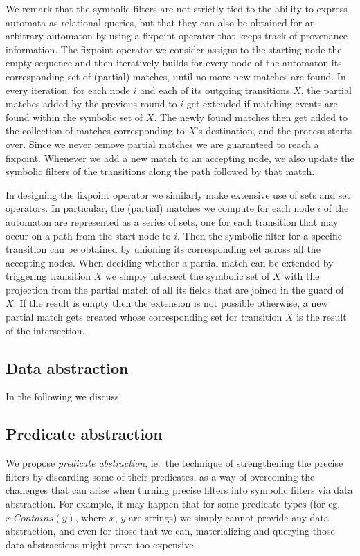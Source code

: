 We remark that the symbolic filters are not strictly tied to the ability to 
express automata as relational queries, but that they can also be obtained for 
an arbitrary automaton by using a fixpoint operator that keeps track of 
provenance information.
The fixpoint operator we consider assigns to the starting node the empty 
sequence and then iteratively builds for every node of the automaton its 
corresponding set of (partial) matches, until no more new matches are found. 
In every iteration, for each node $i$ and each of its outgoing transitions $X$, 
the partial matches added by the previous round to $i$ get extended if matching 
events are found within the symbolic set of $X$. 
The newly found matches then get added to the collection of matches 
corresponding to $X$'s destination, and the process starts over.  
Since we never remove partial matches we are guaranteed to reach a fixpoint.
Whenever we add a new match to an accepting node, we also update the symbolic 
filters of the transitions along the path followed by that match.

In designing the fixpoint operator we similarly make extensive use of sets and 
set operators.
In particular, the (partial) matches we compute for each node $i$ of the 
automaton are represented as a series of sets, one for each transition that may 
occur on a path from the start node to $i$.
Then the symbolic filter for a specific transition can be obtained by unioning 
its corresponding set across all the accepting nodes.
When deciding whether a partial match can be extended by triggering transition 
$X$ we simply intersect the symbolic set of $X$ with the projection from the 
partial match of all its fields that are joined in the guard of $X$.
If the result is empty then the extension is not possible otherwise, a new 
partial match gets created whose corresponding set for transition $X$ is the 
result of the intersection.   

\subsection{Data abstraction}
\label{sec:data_abstraction}


In the following we discuss 

\subsection{Predicate abstraction}
\label{sec:pred_abstraction}


We propose {\em predicate abstraction}, ie.\ the technique of strengthening
 the
precise filters by discarding some of their predicates, as a way of
 overcoming
the challenges that can arise when turning precise filters into symbolic 
filters
via data abstraction.
For example, it may happen that for some predicate types
(for eg.\ $x.Contains(y)$, where $x$, $y$ are strings) we simply cannot
 provide
any data abstraction, and even for those that we can, materializing and
 querying
those data abstractions might prove too expensive.

